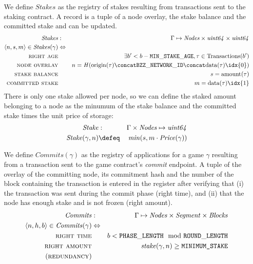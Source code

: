 \begin{definition}
\label{def:stakes}
We define $\mathit{Stakes}$ as the registry of stakes resulting from transactions sent to the staking contract. A record is a tuple of a node overlay, the stake balance and the committed stake and can be updated.  
%
\begin{eqnarray}
\mathit{Stakes}&:&\Gamma\mapsto\mathit{Nodes}\times\mathit{uint64}\times\mathit{uint64}\\
\langle n, s, m\rangle\in\mathit{Stakes}(\gamma)&\Leftrightarrow& \\
\textsc{right age}&&\exists b'<b-\mathtt{MIN\_STAKE\_AGE}, \tau\in\mathrm{Transactions}(b') \\
\textsc{node overlay}&& n = \mathit{H}(\mathrm{origin}(\tau)\concat\mathtt{BZZ\_NETWORK\_ID}\concat\mathrm{data}(\tau)\idx{0})\\
\textsc{stake balance}&& s=\mathrm{amount}(\tau)\\
\textsc{committed stake}&& m=\mathrm{data}(\tau)\idx{1}
\end{eqnarray}
%
There is only one stake allowed per node, so we can define the staked amount belonging to a node as the minumum of the stake balance and the committed stake times the unit price of storage:
% 
\begin{eqnarray}
\mathit{Stake}&:&\Gamma\times\mathit{Nodes}\mapsto\mathit{uint64}\\
\mathit{Stake}(\gamma,n)&\defeq&\mathit{min}(s,m\cdot \mathit{Price}(\gamma))
\end{eqnarray}
%
\end{definition}

\begin{definition}
\label{def:commits}
We define $\mathit{Commits}(\gamma)$ as the registry of applications for a game $\gamma$ resulting from a transaction sent to the game contract's \emph{commit} endpoint. A tuple of the overlay of the committing node, its commitment hash and the number of the block containing the transaction is entered in the register after verifying that (i) the transaction was sent during the commit phase (right time), and (ii) that the node has enough stake and is not frozen (right amount).                    
%
\begin{eqnarray}
\mathit{Commits}&:&\Gamma\mapsto\mathit{Nodes}\times\mathit{Segment}\times\mathit{Blocks}\\
\langle n,h,b\rangle\in\mathit{Commits}(\gamma)&\Leftrightarrow&%
\\
\textsc{right time}
&&b < \mathtt{PHASE\_LENGTH} \mod \mathtt{ROUND\_LENGTH} \\
\textsc{right amount}&&\mathit{stake}(\gamma,n)\geq \texttt{MINIMUM\_STAKE}\\
(\textsc{redundancy})&&
\end{eqnarray}
\end{definition}

